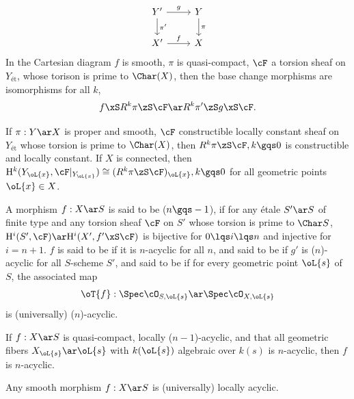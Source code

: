 \documentclass[a4paper, twoside]{article}
\begin{document}
\begin{thm}
  \[
    \begin{tikzcd}
      Y'\ar[r, "g"]\ar[d, "\pi'"] & Y\ar[d, "\pi"] \\
      X'\ar[r, "f"] & X
    \end{tikzcd}
  \]
  In the Cartesian diagram $f$ is smooth, $\pi$ is quasi-compact, $\cF$ a torsion sheaf on $Y_{\text{{\'e}t}}$, whose torison is prime to $\Char(X)$, then the base change morphisms are isomorphisms for all $k$,
  \[
    f\xS R^{k}\pi\zS\cF\ar R^{k}\pi'\zS g\xS\cF.
  \]
\end{thm}

\begin{cor}
  If $\pi:Y\ar X$ is proper and smooth, $\cF$ constructible locally constant sheaf on $Y_{\text{{\'e}t}}$ whose torsion is prime to $\Char(X)$, then $R^{k}\pi\zS\cF,k\gqs0$ is constructible and locally constant. If $X$ is connected, then $\mathrm{H}_{}^{k}(Y_{\oL{x}},\cF|_{Y_{\oL{x}}})\cong (R^{k}\pi\zS\cF)_{\oL{x}}, k\gqs0$ for all geometric points $\oL{x}\in X$.
\end{cor}

\begin{dfn}[Acyclicity]
    A morphism $f:X\ar S$ is said to be  ($n\gqs-1$), if for any {\'e}tale $S'\ar S$ of finite type and any torsion sheaf $\cF$ on $S'$ whose torsion is prime to $\Char S$, $\mathrm{H}_{}^{i}(S',\cF)\ar \mathrm{H}_{}^{i}(X',{f'}\xS\cF)$ is bijective for $0\lqs i\lqs n$ and injective for $i=n+1$. $f$ is said to be  if it is $n$-acyclic for all $n$, and said to be  if $g'$ is ($n$)-acyclic for all $S$-scheme $S'$, and said to be  if for every geometric point $\oL{s}$ of $S$, the associated map
    \[
        \oT{f}:\Spec\cO_{S,\oL{s}}\ar\Spec\cO_{X,\oL{s}}
    \]
    is (universally) ($n$)-acyclic.
\end{dfn}

\begin{thm}
    If $f:X\ar S$ is quasi-compact, locally ($n-1$)-acyclic, and that all geometric fibers $X_{\oL{s}}\ar\oL{s}$ with $k(\oL{s})$ algebraic over $k(s)$ is $n$-acyclic, then $f$ is $n$-acyclic.
\end{thm}

\begin{thm}
    Any smooth morphism $f:X\ar S$ is (universally) locally acyclic.
\end{thm}
\end{document}
